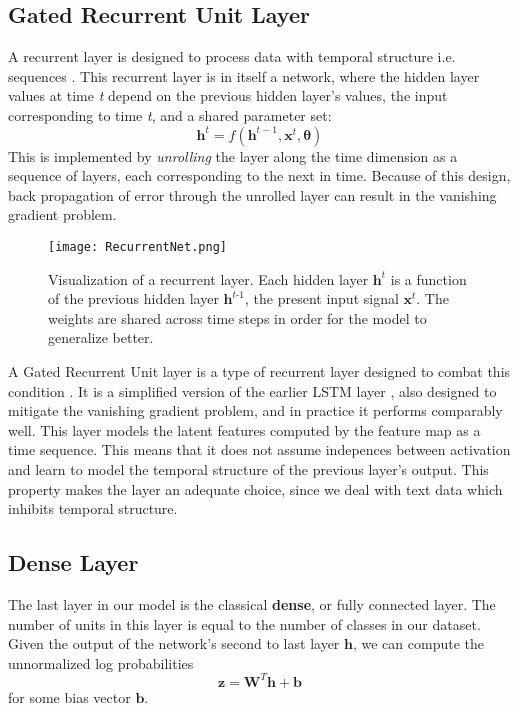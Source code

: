 \subsection{Gated Recurrent Unit Layer}
A recurrent layer is designed to process data with temporal structure i.e. sequences \cite{rumelhart1986sequential}.
This recurrent layer is in itself a network, where the hidden layer values at time \textit{t} depend on the previous
hidden layer's values, the input corresponding to time \textit{t}, and a shared parameter set:
\[\bm{h}^{t} = f(\bm{h}^{t-1}, \bm{x}^{t}, \bm{\theta})\]
This is implemented by \textit{unrolling} the layer along the time dimension as a sequence of layers, each corresponding
to the next in time. Because of this design, back propagation of error through the unrolled layer can result
in the vanishing gradient problem.

\begin{figure}[H]
\caption{Visualization of a recurrent layer. Each hidden layer $\bm{h}^{\textit{t}}$ is a function of the previous hidden
layer $\bm{h}^{\textit{t-1}}$, the present input signal $\bm{x}^{\textit{t}}$. The weights are shared across time steps
in order for the model to generalize better.}
\centering
\texttt{[image: RecurrentNet.png]}
\end{figure}

A Gated Recurrent Unit layer is a type of recurrent layer designed to combat this condition \cite{chung2014empirical}.
It is a simplified version of the earlier LSTM layer \cite{hochreiter1997long}, also designed to mitigate the vanishing gradient problem,
and in practice it performs comparably well.
This layer models the latent features computed by the feature map as a time sequence. This means that it
does not assume indepences between activation and learn to model the temporal structure of the previous
layer's output. This property makes the layer an adequate choice, since we deal with text data which inhibits
temporal structure.

\subsection{Dense Layer}
The last layer in our model is the classical \textbf{dense}, or fully connected layer.
The number of units in this layer is equal to the number of classes in our dataset.
Given the output of the network's second to last layer $\bm{h}$, we can compute the unnormalized log probabilities
\[\bm{z} = \bm{W}^{T}\bm{h} + \bm{b}\]
for some bias vector $\bm{b}$.



